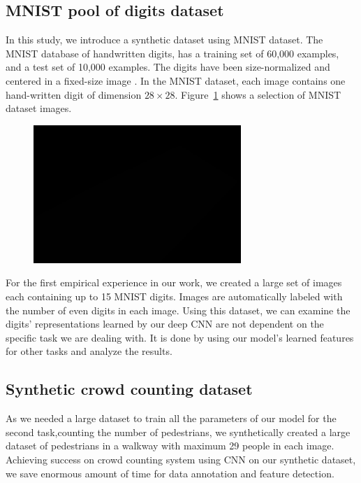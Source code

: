 \subsection{MNIST pool of digits dataset}

In this study, we introduce a synthetic dataset using MNIST dataset. The MNIST database of handwritten digits, has a training set of 60,000 examples, and a test set of 10,000 examples. The digits have been size-normalized and centered in a fixed-size image \cite{lecun1999mnist}. In the MNIST dataset, each image contains one hand-written digit of dimension $28\times28$. Figure~\ref{fig:mnistimages} shows a selection of MNIST dataset images.

\begin{figure}[H]
	\centering
	{\includegraphics[width=0.7\textwidth]{images/1}}
	\caption{}
	\label{fig:mnistimages}
\end{figure}

   
\noindent For the first empirical experience in our work, we created a large set of images each containing up to 15 MNIST digits. Images are automatically labeled with the number of even digits in each image. Using this dataset, we can examine the digits' representations learned by our deep CNN are not dependent on the specific task we are dealing with. It is done by using our model's learned features for other tasks and analyze the results. 

\subsection{Synthetic crowd counting dataset}

As we needed a large dataset to train all the parameters of our model for the second task,counting the number of pedestrians, we synthetically created a large dataset of pedestrians in a walkway with maximum 29 people in each image. Achieving success on crowd counting system using CNN on our synthetic dataset, we save enormous amount of time for data annotation and feature detection. 

